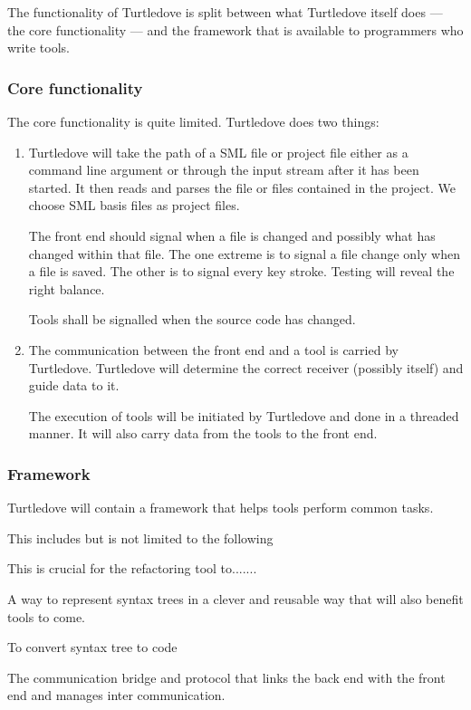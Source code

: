 \documentclass[a4paper,oneside]{article}
\begin{document}
The functionality of Turtledove is split between what Turtledove itself does --- the core
functionality --- and the framework that is available to programmers who write tools.
\subsubsection{Core functionality}
The core functionality is quite limited. Turtledove does two things:
\begin{enumerate}
\item Turtledove will take the path of a SML file or project file either as a command line argument
      or through the input stream after it has been started. It then reads and parses the file or
      files contained in the project. We choose SML basis files as project files.

      The front end should signal when a file is changed and possibly what has changed within that
      file. The one extreme is to signal a file change only when a file is saved. The other is to
      signal every key stroke. Testing will reveal the right balance.

      Tools shall be signalled when the source code has changed.

\item The communication between the front end and a tool is carried by Turtledove. Turtledove will
      determine the correct receiver (possibly itself) and guide data to it.

      The execution of tools will be initiated by Turtledove and done in a threaded manner. It will
      also carry data from the tools to the front end.
\end{enumerate}

\subsubsection{Framework}
Turtledove will contain a framework that helps tools perform common tasks.

This includes but is not limited to the following

\begin{description}
\item[Parsing] This is crucial for the refactoring tool to.......

\item[Syntax tree representation] A way to represent syntax trees in a clever and reusable way
  that will also benefit tools to come.

\item[Pretty printing] To convert syntax tree to code

\item[Serializing] The communication bridge and protocol that links the back
  end with the front end and manages inter communication.
\end{description}
\end{document}

